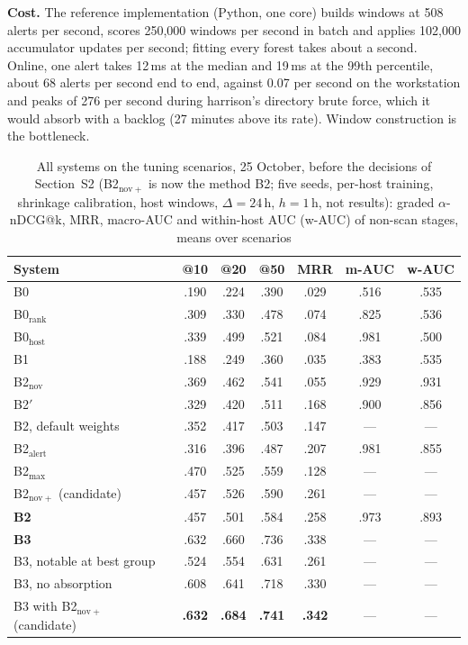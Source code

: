 \documentclass[conference]{IEEEtran}
\begin{document}
\textbf{Cost.} The reference implementation (Python, one core) builds windows at 508 alerts per second, scores 250{,}000 windows per second in batch and applies 102{,}000 accumulator updates per second; fitting every forest takes about a second. Online, one alert takes 12\,ms at the median and 19\,ms at the 99th percentile, about 68 alerts per second end to end, against 0.07 per second on the workstation and peaks of 276 per second during harrison's directory brute force, which it would absorb with a backlog (27 minutes above its rate). Window construction is the bottleneck.

\begin{table}[t]
\caption{All systems on the tuning scenarios, 25 October, before the decisions of Section~S2 (B2$_\mathrm{nov+}$ is now the method B2; five seeds, per-host training, shrinkage calibration, host windows, $\Delta = 24$\,h, $h = 1$\,h, not results): graded $\alpha$-nDCG@k, MRR, macro-AUC and within-host AUC (w-AUC) of non-scan stages, means over scenarios}
\label{tab:tuneall}
\centering\footnotesize
\setlength{\tabcolsep}{3pt}
\begin{tabular}{@{}l cccccc@{}}
\toprule
\textbf{System} & \textbf{@10} & \textbf{@20} & \textbf{@50} & \textbf{MRR} & \textbf{m-AUC} & \textbf{w-AUC} \\
\midrule
B0 & .190 & .224 & .390 & .029 & .516 & .535 \\
B0$_\mathrm{rank}$ & .309 & .330 & .478 & .074 & .825 & .536 \\
B0$_\mathrm{host}$ & .339 & .499 & .521 & .084 & .981 & .500 \\
B1 & .188 & .249 & .360 & .035 & .383 & .535 \\
B2$_\mathrm{nov}$ & .369 & .462 & .541 & .055 & .929 & .931 \\
B2$'$ & .329 & .420 & .511 & .168 & .900 & .856 \\
B2, default weights & .352 & .417 & .503 & .147 & --- & --- \\
B2$_\mathrm{alert}$ & .316 & .396 & .487 & .207 & .981 & .855 \\
B2$_\mathrm{max}$ & .470 & .525 & .559 & .128 & --- & --- \\
B2$_\mathrm{nov+}$ (candidate) & .457 & .526 & .590 & .261 & --- & --- \\
\textbf{B2} & .457 & .501 & .584 & .258 & .973 & .893 \\
\textbf{B3} & .632 & .660 & .736 & .338 & --- & --- \\
B3, notable at best group & .524 & .554 & .631 & .261 & --- & --- \\
B3, no absorption & .608 & .641 & .718 & .330 & --- & --- \\
B3 with B2$_\mathrm{nov+}$ (candidate) & \textbf{.632} & \textbf{.684} & \textbf{.741} & \textbf{.342} & --- & --- \\
\bottomrule
\end{tabular}
\end{table}
\end{document}
